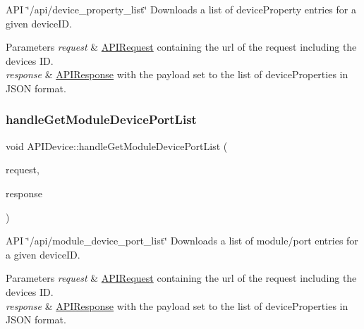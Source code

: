 A\+PI \char`\"{}/api/device\+\_\+property\+\_\+list\char`\"{} Downloads a list of device\+Property entries for a given device\+ID. 
\begin{DoxyParams}{Parameters}
{\em request} & \hyperlink{class_a_p_i_request}{A\+P\+I\+Request} containing the url of the request including the device\textquotesingle{}s ID. \\
\hline
{\em response} & \hyperlink{class_a_p_i_response}{A\+P\+I\+Response} with the payload set to the list of device\+Properties in J\+S\+ON format. \\
\hline
\end{DoxyParams}
\mbox{\label{class_a_p_i_device_ad5a4f48e5cf4767426fd179446501c53}} 
\subsubsection{\texorpdfstring{handle\+Get\+Module\+Device\+Port\+List}{handleGetModuleDevicePortList}}
{\footnotesize\ttfamily void A\+P\+I\+Device\+::handle\+Get\+Module\+Device\+Port\+List (\begin{DoxyParamCaption}\item[{const \hyperlink{class_a_p_i_request}{A\+P\+I\+Request} \&}]{request,  }\item[{\hyperlink{class_a_p_i_response}{A\+P\+I\+Response} $\ast$}]{response }\end{DoxyParamCaption})\hspace{0.3cm}{\ttfamily [slot]}}

A\+PI \char`\"{}/api/module\+\_\+device\+\_\+port\+\_\+list\char`\"{} Downloads a list of module/port entries for a given device\+ID. 
\begin{DoxyParams}{Parameters}
{\em request} & \hyperlink{class_a_p_i_request}{A\+P\+I\+Request} containing the url of the request including the device\textquotesingle{}s ID. \\
\hline
{\em response} & \hyperlink{class_a_p_i_response}{A\+P\+I\+Response} with the payload set to the list of device\+Properties in J\+S\+ON format. \\
\hline
\end{DoxyParams}
\mbox{\label{class_a_p_i_device_a9fa95a9f88e738477ed5e32e22ae6990}} 
